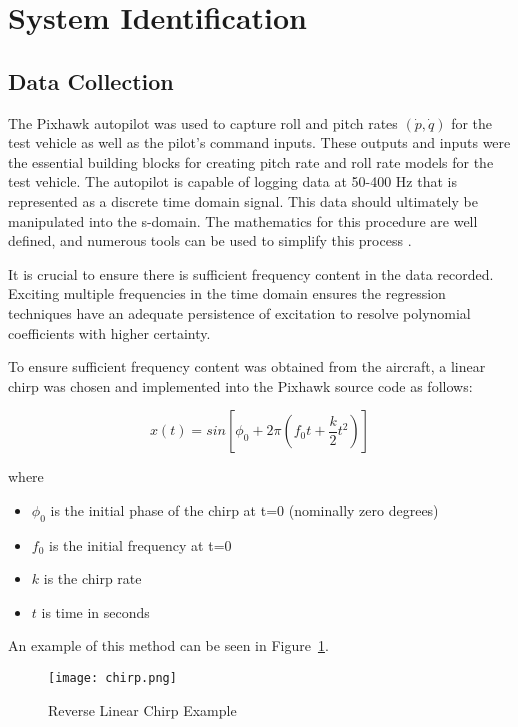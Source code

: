 \label{appendix:system_identification}
\section{System Identification}

\subsection{Data Collection}
The Pixhawk autopilot was used to capture roll and pitch rates $(\dot{p},\dot{q})$ for the test vehicle as well as the pilot's command inputs.  These outputs and inputs were the essential building blocks for creating pitch rate and roll rate models for the test vehicle.  The autopilot is capable of logging data at 50-400 Hz that is represented as a discrete time domain signal.  This data should ultimately be manipulated into the s-domain.  The mathematics for this procedure are well defined, and numerous tools can be used to simplify this process \cite{tfest_matlab}.  

It is crucial to ensure there is sufficient frequency content in the data recorded.  Exciting multiple frequencies in the time domain ensures the regression techniques have an adequate persistence of excitation to resolve polynomial coefficients with higher certainty.  

To ensure sufficient frequency content was obtained from the aircraft, a linear chirp was chosen and implemented into the Pixhawk source code as follows:

\begin{equation}
x(t)=sin\left[\phi_0+2\pi\left(f_0t+\frac{k}{2}t^2\right)\right]
\end{equation}

where
\begin{itemize}
 \item[] $\phi_0$ is the initial phase of the chirp at t=0 (nominally zero degrees)
 \item[] $f_0$ is the initial frequency at t=0
 \item[] $k$ is the chirp rate
 \item[] $t$  is time in seconds
\end{itemize}

An example of this method can be seen in Figure~\ref{fig:chirp}.

\begin{figure}[!h]
 \centering
  \texttt{[image: chirp.png]}
  \caption{Reverse Linear Chirp Example}
  \label{fig:chirp}
\end{figure}

